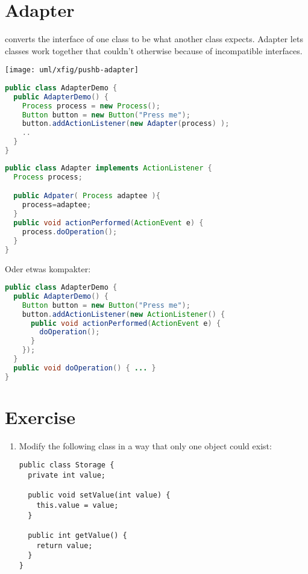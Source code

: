 \section{Adapter}
converts the interface of one class to be what another class expects.
Adapter lets classes work together that couldn't otherwise because of incompatible
interfaces.
\begin{center}
\texttt{[image: uml/xfig/pushb-adapter]}
\end{center}
\newslide
\begin{lstlisting}[language=java]
public class AdapterDemo {
  public AdapterDemo() {
    Process process = new Process();
    Button button = new Button("Press me");
    button.addActionListener(new Adapter(process) );
    ..
  }
}
\end{lstlisting}
\newslide
\begin{lstlisting}[language=java]
public class Adapter implements ActionListener {
  Process process;

  public Adpater( Process adaptee ){
    process=adaptee;
  }
  public void actionPerformed(ActionEvent e) {
    process.doOperation();
  }
}
\end{lstlisting}
\newslide
Oder etwas kompakter:
\begin{lstlisting}[language=java]
public class AdapterDemo {
  public AdapterDemo() {
    Button button = new Button("Press me");
    button.addActionListener(new ActionListener() {
      public void actionPerformed(ActionEvent e) {
        doOperation();
      }
    });
  }
  public void doOperation() { ... }
}
\end{lstlisting}

\section{Exercise}
\begin{enumerate}
\item Modify the following class in a way that only one
object could exist:
\begin{lstlisting}
public class Storage {
  private int value;

  public void setValue(int value) {
    this.value = value;
  }

  public int getValue() {
    return value;
  }
}
\end{lstlisting}
\end{enumerate}

